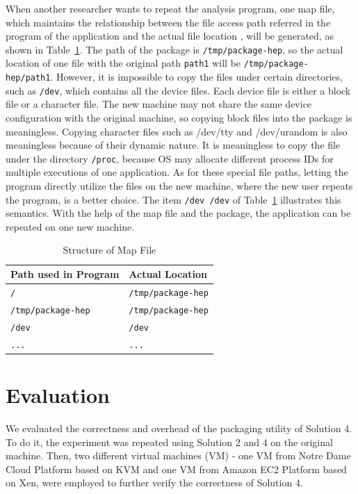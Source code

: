 \documentclass{sig-alternate}
\begin{document}
When another researcher wants to repeat the analysis program,
one map file, which maintains the relationship between the file access path referred in the program of the application and the actual file location 
, will be generated, as shown in Table~\ref{table:map-file}.
The path of the package is {\tt /tmp/package-hep}, so the actual location of one file with the original path {\tt path1} will be {\tt /tmp/package-hep/path1}.
However, 
it is impossible to copy the files under certain directories, such as  {\tt /dev}, which contains all the device files.
Each device file is either a block file or a character file. 
The new machine may not share the same device configuration with the original machine, so copying block files into the package is meaningless.
Copying character files such as /dev/tty and /dev/urandom is also meaningless because of their dynamic nature.
It is meaningless to copy the file under the directory {\tt /proc}, 
because OS may allocate different process IDs for multiple executions of one application.
As for these special file paths, letting
the program directly utilize the files on the new machine, where the new user
repeats the program, is a better choice. 
The item {\tt /dev /dev} of Table~\ref{table:map-file}
illustrates this semantics.
With the help of the map file and the package, the application can be repeated on one new machine. 

\begin{table}
    \centering
    \begin{tabular}{|l|l|}
    \hline
    \bf Path used in Program & \bf Actual Location \\ \hline
    {\tt /} & {\tt /tmp/package-hep} \\ \hline
    {\tt /tmp/package-hep} & {\tt /tmp/package-hep} \\ \hline
    {\tt /dev} & {\tt /dev} \\ \hline
    {\tt ...} & {\tt ...}\\ \hline
    \end{tabular}
    \caption{Structure of Map File}
    \label{table:map-file}
\end{table}

\section{Evaluation}
We evaluated the correctness and overhead of the packaging utility of Solution 4.
To do it, the experiment was repeated using Solution 2 and 4 on the original machine.
Then, two different virtual machines (VM) - one VM from Notre Dame Cloud Platform based on KVM and one VM from Amazon EC2 Platform based on Xen, were employed to further verify the correctness of Solution 4.
\end{document}
